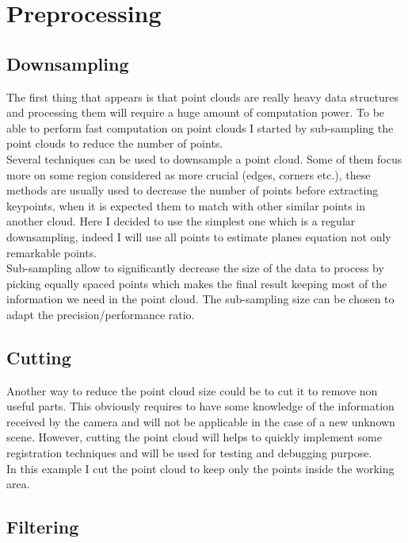 \section{Preprocessing}

\subsection{Downsampling}

The first thing that appears is that point clouds are really heavy data structures and processing them will require a huge amount of computation power. To be able to perform fast computation on point clouds I started by sub-sampling the point clouds to reduce the number of points. \\
Several techniques can be used to downsample a point cloud. Some of them focus more on some region considered as more crucial (edges, corners etc.), these methods are usually used to decrease the number of points before extracting keypoints, when it is expected them to match with other similar points in another cloud. Here I decided to use the simplest one which is a regular downsampling, indeed I will use all points to estimate planes equation not only remarkable points. \\
\newline
Sub-sampling allow to significantly decrease the size of the data to process by picking equally spaced points which makes the final result keeping most of the information we need in the point cloud. The sub-sampling size can be chosen to adapt the precision/performance ratio.

\subsection{Cutting}

Another way to reduce the point cloud size could be to cut it to remove non useful parts. This obviously requires to have some knowledge of the information received by the camera and will not be applicable in the case of a new unknown scene. However, cutting the point cloud will helps to quickly implement some registration techniques and will be used for testing and debugging purpose. \\
In this example I cut the point cloud to keep only the points inside the working area.

\subsection{Filtering}

